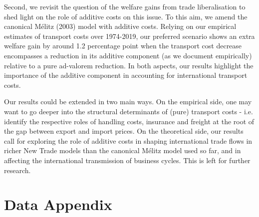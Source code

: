 \documentclass[a4paper,11pt]{article}
\begin{document}
Second, we revisit the question of the welfare gains from trade liberalisation to shed light on the role of additive costs on this issue. To this aim, we amend the canonical M\'{e}litz (2003) model with additive costs. Relying on our empirical estimates of transport
costs over 1974-2019, our preferred scenario shows an extra welfare gain by around 1.2
percentage point when the transport cost decrease encompasses a reduction in its additive
component (as we document empirically) relative to a pure ad-valorem reduction. In both aspects, our results highlight the importance of the additive component in accounting for international transport costs.

Our results could be extended in two main ways.
On the empirical side, one may want to go deeper into the structural determinants of (pure) transport costs - i.e.
identify the respective roles of handling costs, insurance and freight at the root of the gap between export and import prices.
On the theoretical side, our results call for exploring the role of additive costs in shaping international trade flows in richer New Trade models than the canonical M\'{e}litz model used so far, and in affecting the international transmission of business cycles.
This is left for further research.



\newpage




\newpage


\appendix

\clearpage

\setcounter{table}{0}
\renewcommand{\thefigure}{A.\arabic{figure}}
\renewcommand{\thetable}{A.\arabic{table}}


\section{Data Appendix \label{app:data}}
\end{document}
